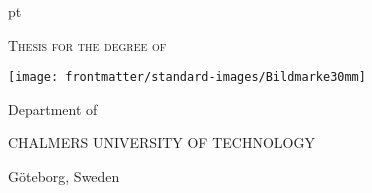 {
 pt
\centering
\thispagestyle{empty}         %


{\scshape Thesis for the degree of 
}

\vspace{3 cm}

{\large \textbf{\thesistitle}}
\vskip 1pc
{\large \thesissubtitle}
\vspace{1.5 cm}
{\normalsize \thesisauthor}

\vfill

\texttt{[image: frontmatter/standard-images/Bildmarke30mm]}

\vspace{1cm}

Department of \thesisdepartment

{\scshape CHALMERS UNIVERSITY OF TECHNOLOGY}

Göteborg, Sweden \thesisyear

\clearpage
}
